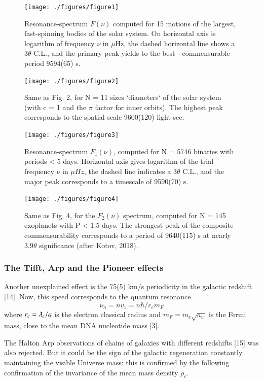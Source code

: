 \documentclass[twoside,draft]{article}
\begin{document}
\begin{sloppypar}
{\begin{figure}
\centering
\texttt{[image: ./figures/figure1]}
\caption{Resonance-spectrum $F(\nu)$ computed for 15 motions of the largest, fast-spinning bodies of
the solar system. On horizontal axis is logarithm of frequency $\nu$ in $\mu$Hz, the dashed horizontal line
shows a $ 3 \theta $ C.L., and the primary peak yields to the best - commensurable period 9594(65) s.}
\label{fig:figure_label}
\end{figure}

\begin{figure}
\centering
\texttt{[image: ./figures/figure2]}
\caption{Same as Fig. 2, for N = 11 sizes `diameters` of the solar system (with c = 1 and the $\pi$
factor for inner orbits). The highest peak corresponds to the spatial scale 9600(120) light sec.}
\label{fig:figure_label}
\end{figure}

\begin{figure}
\centering
\texttt{[image: ./figures/figure3]}
\caption{Resonance-spectrum $F_{1} ( \nu)$, computed for N = 5746 binaries with periods < 5 days.
Horizontal axis gives logarithm of the trial frequency $\nu$ in $\mu Hz$, the dashed line indicates a $3 \theta$
C.L., and the major peak corresponds to a timescale of 9590(70) s.}
\label{fig:figure_label}
\end{figure}

\begin{figure}
\centering
\texttt{[image: ./figures/figure4]}
\caption{Same as Fig. 4, for the $F_{2} ( \nu )$ spectrum, computed for N = 145 exoplanets with P < 1.5
days. The strongest peak of the composite commensurability corresponds to a period of 9640(115) s
at nearly $3.9\theta$ significance (after Kotov, 2018).}
\label{fig:figure_label}
\end{figure}

\subsubsection{The Tifft, Arp and the Pioneer effects}

Another unexplained effect is the 75(5) km/s periodicity in the galactic redshift [14]. Now, this
speed corresponds to the quantum resonance $$\nu_{n} = nv_{1} =n\hbar /r_{e} m_{F} $$ where $r_{e} = \lambdabar_e/a$ is the electron classical radius and $m_{F} = m_{e}\sqrt{a_{w}}$ is the Fermi mass, close to the mean DNA nucleotide mass [3].

The Halton Arp observations of chains of galaxies with different redshifts [15] was also
rejected. But it could be the sign of the galactic regeneration constantly maintaining the visible
Universe mass: this is confirmed by the following confirmation of the invariance of the mean mass
density $\rho_{c}$.

}
\end{sloppypar}
\end{document}
